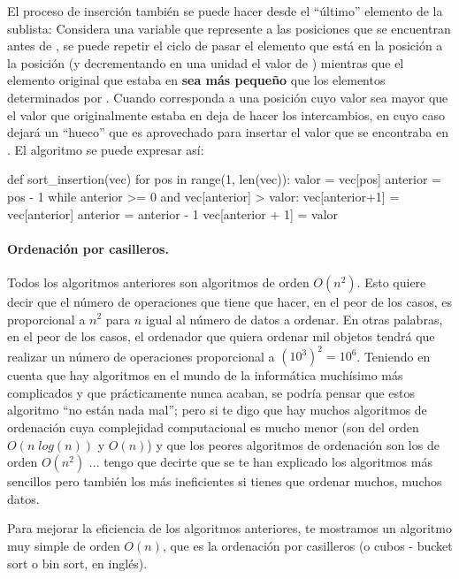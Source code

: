 El proceso de inserción también se puede hacer desde el ``último'' elemento de la sublista: Considera una variable  que represente a las posiciones que se encuentran antes de , se puede repetir el ciclo de pasar el elemento que está en la posición  a la posición  (y decrementando en una unidad el valor de ) mientras que el elemento original que estaba en  {\bf  sea más pequeño} que los elementos determinados por . Cuando  corresponda a una posición cuyo valor  sea mayor que el valor que originalmente estaba en  deja de hacer los intercambios, en cuyo caso dejará un ``hueco'' que es aprovechado para insertar el valor que se encontraba en . El algoritmo se puede expresar así:

\begin{pyverbatim}[][frame=single]
def sort_insertion(vec)
  for pos in range(1, len(vec)):
    valor = vec[pos]
    anterior = pos - 1
    while anterior >= 0 and vec[anterior] > valor:
      vec[anterior+1] = vec[anterior]
      anterior = anterior - 1
    vec[anterior + 1] = valor      
\end{pyverbatim}





\paragraph{Ordenación por casilleros.} 
Todos los algoritmos anteriores son algoritmos de orden $O(n^2)$.
Esto quiere decir que el número de operaciones que tiene que hacer, en el peor de los casos, es proporcional a $n^2$ para $n$ igual al número de datos a ordenar.
En otras palabras, en el peor de los casos, el ordenador que quiera ordenar mil objetos tendrá que realizar un número de operaciones proporcional a  $(10^3)^2=10^6$.
Teniendo en cuenta que hay algoritmos en el mundo de la informática muchísimo más complicados y que prácticamente nunca acaban, se podría pensar que estos algoritmo ``no están nada mal''; pero si te digo que hay muchos algoritmos de ordenación cuya complejidad computacional es mucho menor (son del orden $O(n\; log(n))$ y $O(n)$) y que los peores algoritmos de ordenación son los de orden $O(n^2)$ ...  tengo que decirte que se te han explicado los algoritmos más sencillos pero también los más ineficientes si tienes que ordenar muchos, muchos datos.

Para mejorar la eficiencia de los algoritmos anteriores, te mostramos un algoritmo muy simple de orden $O(n)$, que es la ordenación por casilleros (o cubos - bucket sort o bin sort, en inglés).


